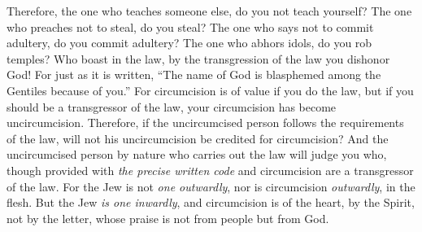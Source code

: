 \begin{biblechapter}
\verse Therefore, the one who teaches someone else, do you not teach yourself? The one who preaches not to steal, do you steal?
\verse The one who says not to commit adultery, do you commit adultery? The one who abhors idols, do you rob temples?
\verse Who boast in the law, by the transgression of the law you dishonor God!
\verse For just as it is written, “The name of God is blasphemed among the Gentiles because of you.”
\verse For circumcision is of value if you do the law, but if you should be a transgressor of the law, your circumcision has become uncircumcision.
\verse Therefore, if the uncircumcised person follows the requirements of the law, will not his uncircumcision be credited for circumcision?
\verse And the uncircumcised person by nature who carries out the law will judge you who, though provided with \textit{the precise written code} and circumcision are a transgressor of the law.
\verse For the Jew is not \textit{one outwardly}, nor is circumcision \textit{outwardly}, in the flesh.
\verse But the Jew \textit{is one inwardly}, and circumcision is of the heart, by the Spirit, not by the letter, whose praise is not from people but from God.
\end{biblechapter}


